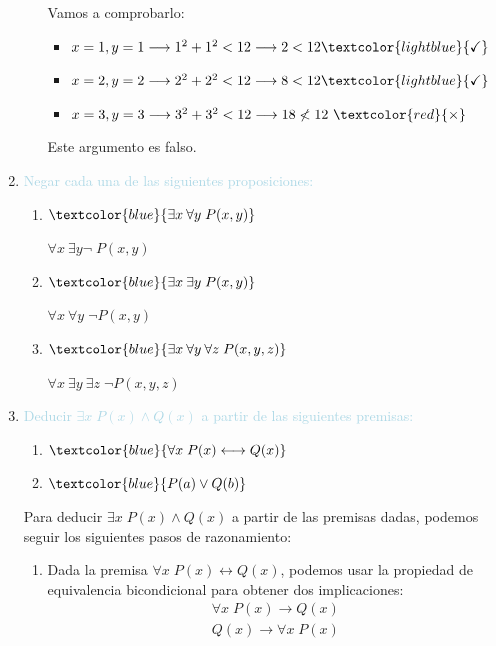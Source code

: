 \documentclass{article}
\newcommand{\lb}[1]{\textcolor{lightblue}{#1}}
\newcommand{\db}[1]{\textcolor{blue}{#1}}
\newcommand{\rc}[1]{\textcolor{red}{#1}}
\begin{document}
\begin{enumerate}[label=\color{red}\textbf{\arabic*)}, leftmargin=*]
\begin{enumerate}[label=\color{red}\alph*)]
            Vamos a comprobarlo:
            \begin{itemize}[label=$-$]
            \item $x=1,y=1\longrightarrow 1^2+1^2<12\longrightarrow2<12\lb{\checkmark}$
            \item $x=2,y=2\longrightarrow 2^2+2^2<12\longrightarrow8<12\lb{\checkmark}$
            \item $x=3,y=3\longrightarrow 3^2+3^2<12\longrightarrow18\nless12~\rc{\times}$
            \end{itemize}
            
            Este argumento es falso.
      \end{enumerate}
      \item \lb{Negar cada una de las siguientes proposiciones:}
      \begin{enumerate}[label=\color{red}\alph*)]
            \item $\db{\exists x\:\forall y\;P(x,y)}$
            
            $\forall x\:\exists y\neg\;P(x,y)$
            \item $\db{\exists x\:\exists y\;P(x,y)}$
            
            $\forall x\:\forall y\;\neg P(x,y)$
            \item $\db{\exists x\:\forall y\:\forall z\;P(x,y,z)}$
            
            $\forall x\:\exists y\:\exists z\;\neg P(x,y,z)$
      \end{enumerate}
      \item \lb{Deducir $\exists x\;P(x)\wedge Q(x)$ a partir de las siguientes premisas:}
      \begin{enumerate}[label=\color{red}\alph*)]
            \item $\db{\forall x\;P(x)\longleftrightarrow Q(x)}$
            \item $\db{P(a)\vee Q(b)}$
      \end{enumerate}
      
      Para deducir $\exists x\;P(x) \wedge Q(x)$ a partir de las premisas dadas, podemos seguir los siguientes pasos de razonamiento:
      
      \begin{enumerate}[label=\arabic*)]
      \item  Dada la premisa $\forall x\;P(x) \longleftrightarrow Q(x)$, podemos usar la propiedad de equivalencia bicondicional para obtener dos implicaciones:
         \begin{align*}
\forall x\;P(x) \longrightarrow Q(x) \\
Q(x) \longrightarrow \forall x\;P(x)
         \end{align*}
      

\end{enumerate}
\end{enumerate}
\end{document}
